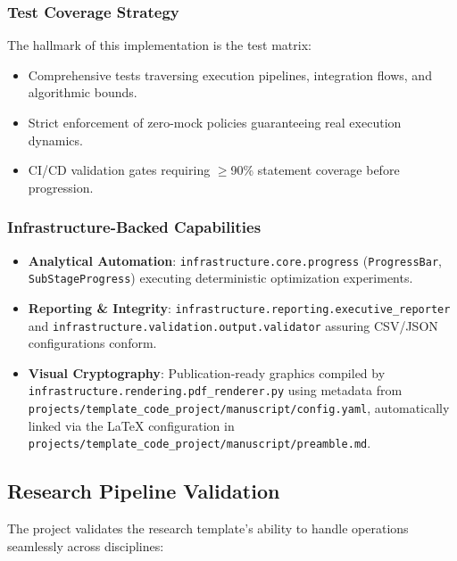 \documentclass[
]{article}
\providecommand{\tightlist}{%
  \setlength{\itemsep}{0pt}\setlength{\parskip}{0pt}}
\begin{document}
\subsubsection{Test Coverage Strategy}\label{test-coverage-strategy}

The hallmark of this implementation is the test matrix:

\begin{itemize}
\tightlist
\item
  Comprehensive tests traversing execution pipelines, integration flows,
  and algorithmic bounds.
\item
  Strict enforcement of zero-mock policies guaranteeing real execution
  dynamics.
\item
  CI/CD validation gates requiring \texorpdfstring{\ensuremath{\geq}}{>=}90\% statement coverage before
  progression.
\end{itemize}

\subsubsection{Infrastructure-Backed
Capabilities}\label{infrastructure-backed-capabilities}

\begin{itemize}
\tightlist
\item
  \textbf{Analytical Automation}: \texttt{infrastructure.core.progress}
  (\texttt{ProgressBar}, \texttt{SubStageProgress}) executing
  deterministic optimization experiments.
\item
  \textbf{Reporting \& Integrity}:
  \texttt{infrastructure.reporting.executive\_reporter} and
  \texttt{infrastructure.validation.output.validator} assuring CSV/JSON
  configurations conform.
\item
  \textbf{Visual Cryptography}: Publication-ready graphics compiled by
  \texttt{infrastructure.rendering.pdf\_renderer.py} using metadata from
  \texttt{projects/template\_code\_project/manuscript/config.yaml},
  automatically linked via the LaTeX configuration in
  \texttt{projects/template\_code\_project/manuscript/preamble.md}.
\end{itemize}

\subsection{Research Pipeline
Validation}\label{research-pipeline-validation}

The project validates the research template's ability to handle
operations seamlessly across disciplines:
\end{document}
